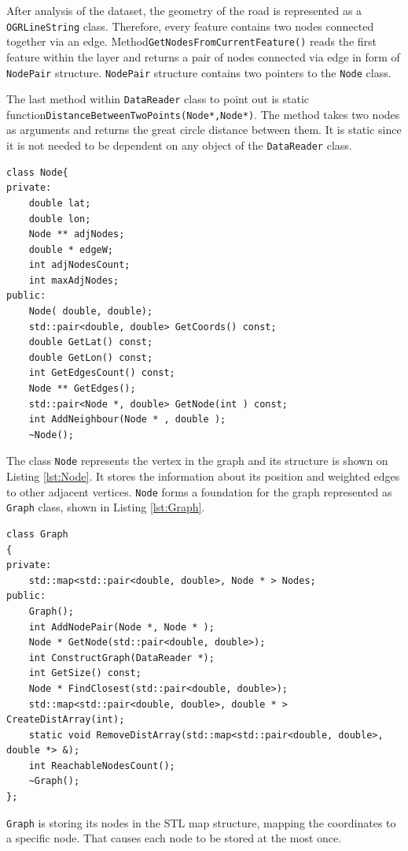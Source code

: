 \documentclass[thesis=M,english]{FITthesis}[2012/10/20]
\begin{document}
After analysis of the dataset, the geometry of the road is represented as a \texttt{OGRLineString} class. Therefore, every feature contains two nodes connected together via an edge. Method\texttt{GetNodesFromCurrentFeature()} reads the first feature within the layer and returns a pair of nodes connected via edge in form of \texttt{NodePair} structure. \texttt{NodePair} structure contains two pointers to the \texttt{Node} class. 

The last method within \texttt{DataReader} class to point out is static function\texttt{DistanceBetweenTwoPoints(Node*,Node*)}. The method takes two nodes as arguments and returns the great circle distance between them. It is static since it is not needed to be dependent on any object of the \texttt{DataReader} class.

\begin{lstlisting}[frame=single, caption={\texttt{Node} class}, label={lst:Node}]
class Node{
private:
    double lat;
    double lon;
    Node ** adjNodes;
    double * edgeW;
    int adjNodesCount;
    int maxAdjNodes;
public:
    Node( double, double);
    std::pair<double, double> GetCoords() const;
    double GetLat() const;
    double GetLon() const;
    int GetEdgesCount() const;
    Node ** GetEdges();
    std::pair<Node *, double> GetNode(int ) const; 
	int AddNeighbour(Node * , double );
    ~Node();
\end{lstlisting}

The class \texttt{Node} represents the vertex in the graph and its structure is shown on Listing \ref{lst:Node}. It stores the information about its position and weighted edges to other adjacent vertices. \texttt{Node} forms a foundation for the graph represented as \texttt{Graph} class, shown in Listing \ref{lst:Graph}.

\begin{lstlisting}[frame=single, caption={\texttt{Graph} class}, label={lst:Graph}, breaklines=true]
class Graph
{
private:
    std::map<std::pair<double, double>, Node * > Nodes;
public:
    Graph();
    int AddNodePair(Node *, Node * );
    Node * GetNode(std::pair<double, double>);
    int ConstructGraph(DataReader *);
    int GetSize() const;
    Node * FindClosest(std::pair<double, double>);
    std::map<std::pair<double, double>, double * > CreateDistArray(int);
    static void RemoveDistArray(std::map<std::pair<double, double>, double *> &);
    int ReachableNodesCount();
    ~Graph();
};
\end{lstlisting}

\texttt{Graph} is storing its nodes in the STL map structure, mapping the coordinates to a specific node. That causes each node to be stored at the most once.
\end{document}
